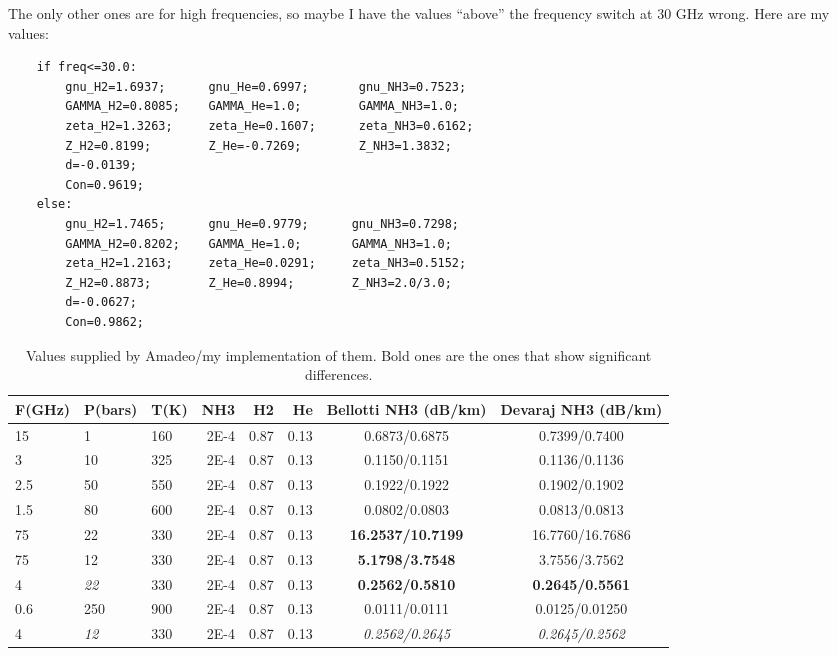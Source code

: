 \documentclass[11pt]{article}
\begin{document}
The only other ones are for high frequencies, so maybe I have the values ``above'' the frequency switch at 30 GHz wrong.  Here are my values:
\begin{verbatim}
    if freq<=30.0:
        gnu_H2=1.6937;      gnu_He=0.6997;       gnu_NH3=0.7523;
        GAMMA_H2=0.8085;    GAMMA_He=1.0;        GAMMA_NH3=1.0;
        zeta_H2=1.3263;     zeta_He=0.1607;      zeta_NH3=0.6162;
        Z_H2=0.8199;        Z_He=-0.7269;        Z_NH3=1.3832;
        d=-0.0139;
        Con=0.9619;
    else:
        gnu_H2=1.7465;      gnu_He=0.9779;      gnu_NH3=0.7298;
        GAMMA_H2=0.8202;    GAMMA_He=1.0;       GAMMA_NH3=1.0;
        zeta_H2=1.2163;     zeta_He=0.0291;     zeta_NH3=0.5152;
        Z_H2=0.8873;        Z_He=0.8994;        Z_NH3=2.0/3.0;
        d=-0.0627;
        Con=0.9862;
\end{verbatim}

\begin{table}
\caption{Values supplied by Amadeo/my implementation of them.  Bold ones are the ones that show significant differences.}
\begin{tabular}{| l | l | l | r | r | r | c | c |} \hline
 {\bf F(GHz)}& {\bf P(bars)}& {\bf T(K)} &  {\bf NH3}  &  {\bf H2}  &  {\bf He}  & {\bf Bellotti NH3 (dB/km)} & {\bf Devaraj NH3 (dB/km)} \\ \hline
 15    & 1      & 160  &  2E-4 & 0.87 & 0.13 &        0.6873/0.6875        &        0.7399/0.7400       \\ \hline
 3     & 10     & 325  &  2E-4 & 0.87 & 0.13 &        0.1150/0.1151        &        0.1136/0.1136       \\ \hline
 2.5   & 50     & 550  &  2E-4 & 0.87 & 0.13 &        0.1922/0.1922        &        0.1902/0.1902       \\ \hline
 1.5   & 80     & 600  &  2E-4 & 0.87 & 0.13 &        0.0802/0.0803        &        0.0813/0.0813       \\ \hline
 75    & 22     & 330  &  2E-4 & 0.87 & 0.13 &        {\bf 16.2537/10.7199}       &        16.7760/16.7686       \\ \hline
 75    & 12     & 330  &  2E-4 & 0.87 & 0.13 &        {\bf 5.1798/3.7548}        &        3.7556/3.7562       \\ \hline
 4     & {\em 22}     & 330  &  2E-4 & 0.87 & 0.13 &        {\bf 0.2562/0.5810}        &        {\bf 0.2645/0.5561}       \\ \hline
 0.6   & 250    & 900  &  2E-4 & 0.87 & 0.13 &        0.0111/0.0111        &        0.0125/0.01250       \\ \hline \hline \hline
 4     & {\em 12}     & 330  &  2E-4 & 0.87 & 0.13 &        {\em 0.2562/0.2645}        &        {\em 0.2645/0.2562}       \\ \hline
\end{tabular}
\end{table}



\end{document}
